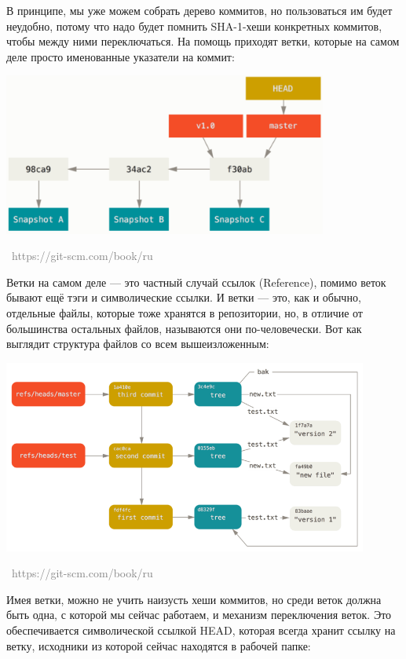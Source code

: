 \documentclass[a5paper]{article}
\newcommand{\attribution}[1] {
\vspace{-5mm}\begin{flushright}\begin{scriptsize}\textcolor{gray}{\textcopyright\, #1}\end{scriptsize}\end{flushright}
}
\begin{document}
В принципе, мы уже можем собрать дерево коммитов, но пользоваться им будет неудобно, потому что надо будет помнить SHA-1-хеши конкретных коммитов, чтобы между ними переключаться. На помощь приходят ветки, которые на самом деле просто именованные указатели на коммит:

\begin{center}
	\includegraphics[width=0.8\textwidth]{branches.png}
	\attribution{https://git-scm.com/book/ru}
\end{center}

Ветки на самом деле --- это частный случай ссылок (Reference), помимо веток бывают ещё тэги и символические ссылки. И ветки --- это, как и обычно, отдельные файлы, которые тоже хранятся в репозитории, но, в отличие от большинства остальных файлов, называются они по-человечески. Вот как выглядит структура файлов со всем вышеизложенным:

\begin{center}
	\includegraphics[width=0.9\textwidth]{gitRefs.png}
	\attribution{https://git-scm.com/book/ru}
\end{center}

Имея ветки, можно не учить наизусть хеши коммитов, но среди веток должна быть одна, с которой мы сейчас работаем, и механизм переключения веток. Это обеспечивается символической ссылкой HEAD, которая всегда хранит ссылку на ветку, исходники из которой сейчас находятся в рабочей папке:
\end{document}
